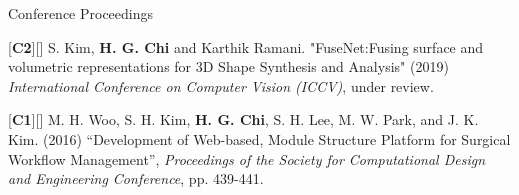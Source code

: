 


\begin{cventries}

\cvpub
{Conference Proceedings} %
{ %
\begin{cvitems}
\item {[\textbf{C2}][\href{https://docs.google.com/viewer?url=https://github.com/stnoah1/CV/raw/master/documents/ICCV.pdf}{}] S. Kim, \textbf{H. G. Chi} and Karthik Ramani. "FuseNet:Fusing surface and volumetric representations for 3D Shape Synthesis and Analysis" (2019) \textit{International Conference on Computer Vision (ICCV)}, under review.}
\item {[\textbf{C1}][\href{https://docs.google.com/viewer?url=https://github.com/stnoah1/CV/raw/master/documents/SWORM.pdf}{}] M. H. Woo, S. H. Kim, \textbf{H. G. Chi}, S. H. Lee, M. W. Park, and J. K. Kim. (2016) “Development of Web-based, Module Structure Platform for Surgical Workflow Management”, \textit{Proceedings of the Society for Computational Design and Engineering Conference}, pp. 439-441.}
\end{cvitems}
}




\end{cventries}

